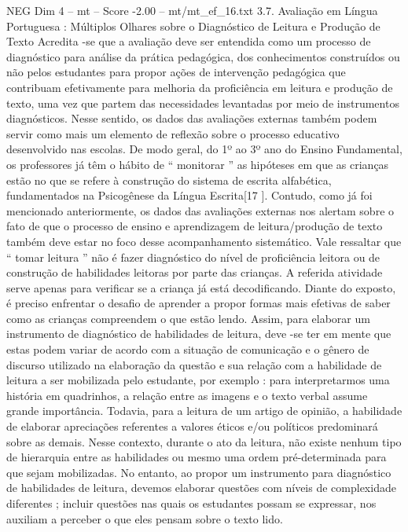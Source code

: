 \begin{textsample}{NEG Dim 4 – mt – Score -2.00 – mt/mt\_ef\_16.txt}  \label{ex:f4_neg_117}
3.7.
Avaliação em Língua Portuguesa : Múltiplos Olhares sobre o Diagnóstico de Leitura e Produção de Texto Acredita -se que a avaliação deve ser entendida como um processo de diagnóstico para análise da prática pedagógica, dos conhecimentos construídos ou não pelos estudantes para propor ações de intervenção pedagógica que contribuam efetivamente para melhoria da proficiência em leitura e produção de texto, uma vez que partem das necessidades levantadas por meio de instrumentos diagnósticos.
Nesse sentido, os dados das avaliações externas também podem servir como mais um elemento de reflexão sobre o processo educativo desenvolvido nas escolas.
De modo geral, do 1º ao 3º ano do Ensino Fundamental, os professores já têm o hábito de “ monitorar ” as hipóteses em que as crianças estão no que se refere à construção do sistema de escrita alfabética, fundamentados na Psicogênese da Língua Escrita[17 ].
Contudo, como já foi mencionado anteriormente, os dados das avaliações externas nos alertam sobre o fato de que o processo de ensino e aprendizagem de leitura/produção de texto também deve estar no foco desse acompanhamento sistemático.
Vale ressaltar que “ tomar leitura ” não é fazer diagnóstico do nível de proficiência leitora ou de construção de habilidades leitoras por parte das crianças.
A referida atividade serve apenas para verificar se a criança já está decodificando.
Diante do exposto, é preciso enfrentar o desafio de aprender a propor formas mais efetivas de saber como as crianças compreendem o que estão lendo.
Assim, para elaborar um instrumento de diagnóstico de habilidades de leitura, deve -se ter em mente que estas podem variar de acordo com a situação de comunicação e o gênero de discurso utilizado na elaboração da questão e sua relação com a habilidade de leitura a ser mobilizada pelo estudante, por exemplo : para interpretarmos uma história em quadrinhos, a relação entre as imagens e o texto verbal assume grande importância.
Todavia, para a leitura de um artigo de opinião, a habilidade de elaborar apreciações referentes a valores éticos e/ou políticos predominará sobre as demais.
Nesse contexto, durante o ato da leitura, não existe nenhum tipo de hierarquia entre as habilidades ou mesmo uma ordem pré-determinada para que sejam mobilizadas.
No entanto, ao propor um instrumento para diagnóstico de habilidades de leitura, devemos elaborar questões com níveis de complexidade diferentes ; incluir questões nas quais os estudantes possam se expressar, nos auxiliam a perceber o que eles pensam sobre o texto lido.

\end{textsample}
